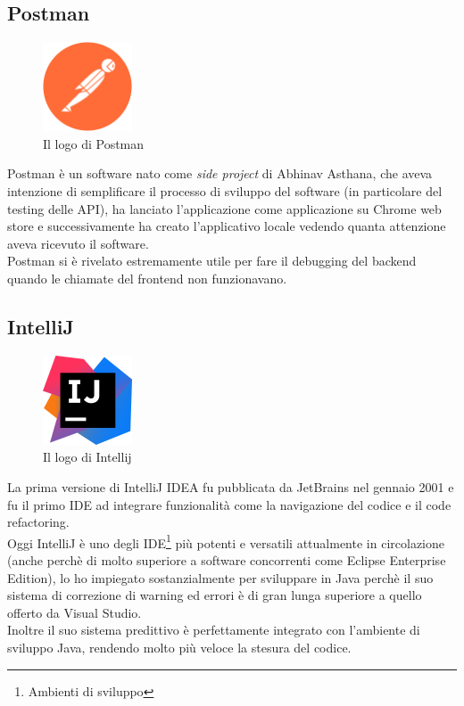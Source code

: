 \subsection{Postman}
\begin{figure}[h]
    \centering
    \includegraphics[width=100px]{./images/postman.png}
    \caption{Il logo di Postman}
    \label{fig:Postman}
\end{figure}
Postman è un software nato come \emph{side project} di Abhinav Asthana, che aveva intenzione di semplificare il processo di sviluppo del software (in particolare del testing delle API), ha lanciato l'applicazione come applicazione su Chrome web store e successivamente ha creato l'applicativo locale vedendo quanta attenzione aveva ricevuto il software.\cite{PostmanWiki}
\\
Postman si è rivelato estremamente utile per fare il debugging del backend quando le chiamate del frontend non funzionavano.

\subsection{IntelliJ}
\begin{figure}[h]
    \centering
    \includegraphics[width=100px]{./images/intellij.png}
    \caption{Il logo di Intellij}
    \label{fig:Intellij}
\end{figure}
La prima versione di IntelliJ IDEA fu pubblicata da JetBrains nel gennaio 2001 e fu il primo IDE ad integrare funzionalità come la navigazione del codice e il code refactoring.\cite{IntellijWiki}
\\
Oggi IntelliJ è uno degli IDE\footnote{Ambienti di sviluppo} più potenti e versatili attualmente in circolazione (anche perchè di molto superiore a software concorrenti come Eclipse Enterprise Edition), lo ho impiegato sostanzialmente per sviluppare in Java perchè il suo sistema di correzione di warning ed errori è di gran lunga superiore a quello offerto da Visual Studio.
\\
Inoltre il suo sistema predittivo è perfettamente integrato con l'ambiente di sviluppo Java, rendendo molto più veloce la stesura del codice.

